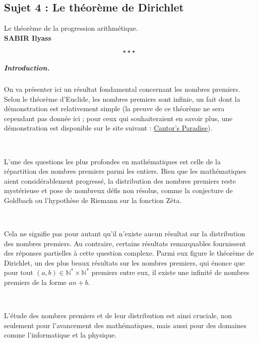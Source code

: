 \begin{center}
\subsection*{Sujet 4 : Le th{\'e}or{\`e}me de Dirichlet}\label{sjt4}
Le th{\'e}or{\`e}me de la progression arithm{\'e}tique.\\
\textbf{SABIR Ilyass}
\end{center}
\[ \star \star \star \]

\subparagraph{Introduction.}

On va pr{\'e}senter ici un r{\'e}sultat fondamental concernant les nombres
premiers. Selon le th{\'e}or{\`e}me d'Euclide, les nombres premiers sont
infinie, un fait dont la d{\'e}monstration est relativement simple (la preuve
de ce th{\'e}or{\`e}me ne sera cependant pas donn{\'e}e ici ; pour ceux qui
souhaiteraient en savoir plus, une d{\'e}monstration est disponible sur le
site suivant :
\href{https://www.cantorsparadise.com/how-to-prove-the-infinity-of-primes-9ccfbe9bdd6a}{Cantor's
Paradise}).

\

L'une des questions les plus profondes en math{\'e}matiques est celle de la
r{\'e}partition des nombres premiers parmi les entiers. Bien que les
math{\'e}matiques aient consid{\'e}rablement progress{\'e}, la distribution
des nombres premiers reste myst{\'e}rieuse et pose de nombreux d{\'e}fis non
r{\'e}solus, comme la conjecture de Goldbach ou l'hypoth{\`e}se de Riemann sur
la fonction Z{\^e}ta.

\

Cela ne signifie pas pour autant qu'il n'existe aucun r{\'e}sultat sur la
distribution des nombres premiers. Au contraire, certains r{\'e}sultats
remarquables fournissent des r{\'e}ponses partielles {\`a} cette question
complexe. Parmi eux figure le th{\'e}or{\`e}me de Dirichlet, un des plus beaux
r{\'e}sultats sur les nombres premiers, qui {\'e}nonce que pour tout $(a, b)
\in \mathbb{N}^{\ast} \times \mathbb{N}^{\ast}$ premiers entre eux, il existe
une infinit{\'e} de nombres premiers de la forme $a n + b$.

\

L'{\'e}tude des nombres premiers et de leur distribution est ainsi cruciale,
non seulement pour l'avancement des math{\'e}matiques, mais aussi pour des
domaines comme l'informatique et la physique.

